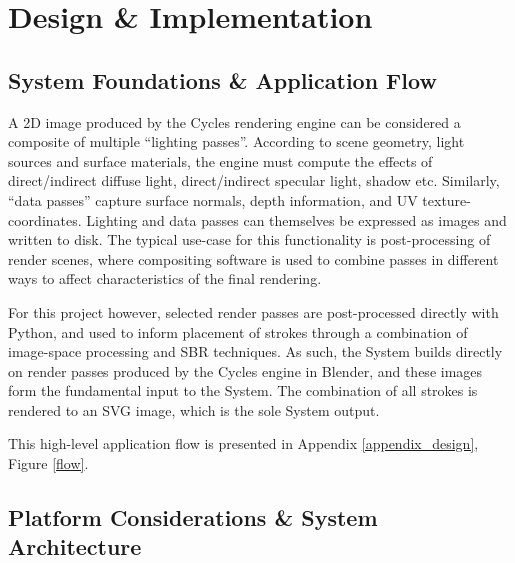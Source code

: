 


\chapter{Design \& Implementation}\label{design_implementation}

\section{System Foundations \& Application Flow}

A 2D image produced by the Cycles rendering engine can be considered a composite of multiple ``lighting passes''.
According to scene geometry, light sources and surface materials, the engine must compute the effects of direct/indirect diffuse light, direct/indirect specular light, shadow etc.
Similarly, ``data passes'' capture surface normals, depth information, and UV texture-coordinates.
Lighting and data passes can themselves be expressed as images and written to disk.
The typical use-case for this functionality is post-processing of render scenes, where compositing software is used to combine passes in different ways to affect characteristics of the final rendering.

For this project however, selected render passes are post-processed directly with Python, and used to inform placement of strokes through a combination of image-space processing and SBR techniques. As such, the System builds directly on render passes produced by the Cycles engine in Blender, and these images form the fundamental input to the System. The combination of all strokes is rendered to an SVG image, which is the sole System output.

This high-level application flow is presented in Appendix \ref{appendix_design}, Figure \ref{flow}.

\section{Platform Considerations \& System Architecture}

